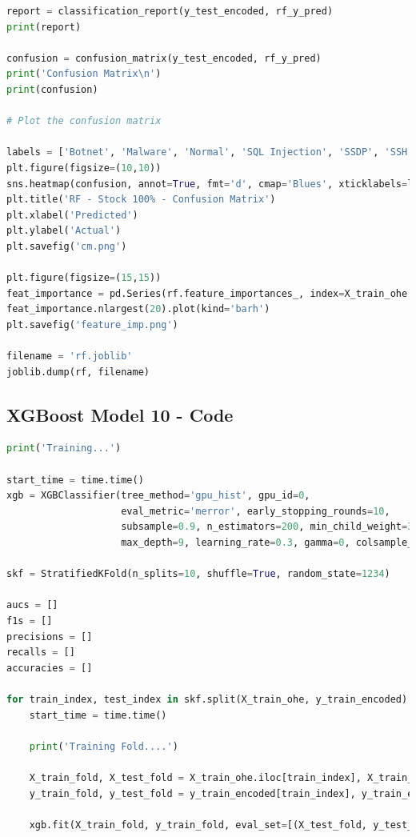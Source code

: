 \begin{appendices}
\begin{lstlisting}[language=Python]
report = classification_report(y_test_encoded, rf_y_pred)
print(report)

confusion = confusion_matrix(y_test_encoded, rf_y_pred)
print('Confusion Matrix\n')
print(confusion)

# Plot the confusion matrix

labels = ['Botnet', 'Malware', 'Normal', 'SQL Injection', 'SSDP', 'SSH', 'Website Spoofing' ]
plt.figure(figsize=(10,10))
sns.heatmap(confusion, annot=True, fmt='d', cmap='Blues', xticklabels=labels, yticklabels=labels)
plt.title('RF - Stock 100% - Confusion Matrix')
plt.xlabel('Predicted')
plt.ylabel('Actual')
plt.savefig('cm.png')

plt.figure(figsize=(15,15))
feat_importance = pd.Series(rf.feature_importances_, index=X_train_ohe.columns)
feat_importance.nlargest(20).plot(kind='barh')
plt.savefig('feature_imp.png')

filename = 'rf.joblib'
joblib.dump(rf, filename)
\end{lstlisting}


\subsection{XGBoost Model 10 - Code} 
\label{appx: XGB Model 10 - Code}

\begin{lstlisting}[language=Python]
print('Training...')

start_time = time.time()
xgb = XGBClassifier(tree_method='gpu_hist', gpu_id=0, 
                    eval_metric='merror', early_stopping_rounds=10, 
                    subsample=0.9, n_estimators=200, min_child_weight=3, 
                    max_depth=9, learning_rate=0.3, gamma=0, colsample_bytree=0.7, verbose=1)

skf = StratifiedKFold(n_splits=10, shuffle=True, random_state=1234)

aucs = []
f1s = []
precisions = []
recalls = []
accuracies = []

for train_index, test_index in skf.split(X_train_ohe, y_train_encoded):
    start_time = time.time()

    print('Training Fold....')

    X_train_fold, X_test_fold = X_train_ohe.iloc[train_index], X_train_ohe.iloc[test_index]
    y_train_fold, y_test_fold = y_train_encoded[train_index], y_train_encoded[test_index]
    
    xgb.fit(X_train_fold, y_train_fold, eval_set=[(X_test_fold, y_test_fold)], verbose=False)
    

\end{lstlisting}
\end{appendices}

